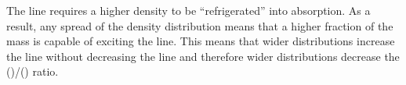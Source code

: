 The \formaldehyde \twotwo line requires a higher density to be ``refrigerated''
into absorption.  As a result, any spread of the density distribution means
that a higher fraction of the mass is capable of exciting the \twotwo line.
This means that wider distributions increase the \twotwo line without
decreasing the \oneone line and therefore wider distributions decrease the
(\oneone)/(\twotwo) ratio.  

%
%



